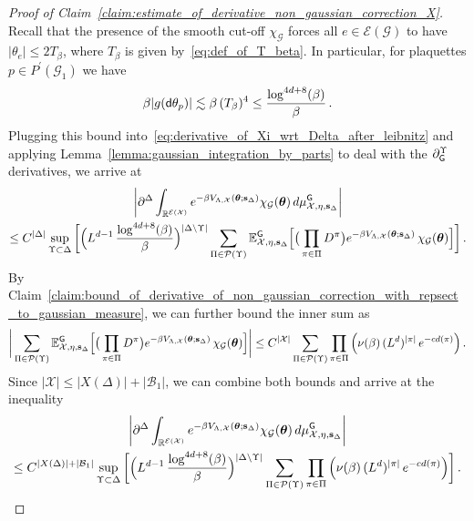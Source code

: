 \documentclass[10pt,a4paper]{amsart}
\def\La{{\Lambda}}
\newcommand{\bE}{\mathbb E}
\newcommand{\bR}{\mathbb R}
\newcommand{\cE}{\mathcal{E}}
\begin{document}
    \begin{proof}[Proof of Claim~\ref{claim:estimate_of_derivative_non_gaussian_correction_X}]
        Recall that the presence of the smooth cut-off $\chi_\mathcal{G}$ forces all $e\in \cE(\mathcal{G})$ to have $|\theta_e| \le 2 T_\beta$, where $T_\beta$ is given by~\eqref{eq:def_of_T_beta}. In particular, for plaquettes $p\in P^\prime(\mathcal{G}_1)$ we have 
        \[
        \beta |g({\sf d}\theta_p)| \lesssim \beta \,  (T_\beta)^4 \le \frac{\log^{4d+8}(\beta)}{\beta} \, .
        \]
        Plugging this bound into~\eqref{eq:derivative_of_Xi_wrt_Delta_after_leibnitz} and applying Lemma~\ref{lemma:gaussian_integration_by_parts} to deal with the $\partial_{\sf G}^{\Upsilon}$ derivatives, we arrive at 
        \begin{multline*}
            \bigg|\partial^\Delta \int_{\bR^{\cE(\mathcal{X})}} e^{-\beta V_{\Lambda,\mathcal{X}}(\boldsymbol{\theta};\mathbf{s}_\Delta)} \chi_{\mathcal{G}}(\boldsymbol{\theta}) \, {\rm d}\mu_{\mathcal{X},\eta,\mathbf{s}_\Delta}^{\sf G} \bigg| \\ \le C^{|\Delta|} \sup_{\Upsilon\subset \Delta} \bigg[ \Big(L^{d-1} \, \frac{\log^{4d+8}(\beta)}{\beta}\Big)^{|\Delta \setminus \Upsilon|} \sum_{\Pi\in \mathcal{P}(\Upsilon)} \bE_{\mathcal{X},\eta,\mathbf{s}_{\Delta}}^{\sf G} \Big[ \big( \prod_{\pi\in \Pi} D^\pi\big) e^{-\beta V_{\La,\mathcal{X}} (\boldsymbol{\theta}; \mathbf{s}_{\Delta})} \, \chi_{\mathcal{G}} (\boldsymbol{\theta})  \Big] \bigg] \, .
        \end{multline*}
        By Claim~\ref{claim:bound_of_derivative_of_non_gaussian_correction_with_repsect_to_gaussian_measure}, we can further bound the inner sum as
        \[
        \bigg|\sum_{\Pi\in \mathcal{P}(\Upsilon)} \bE_{\mathcal{X},\eta,\mathbf{s}_{\Delta}}^{\sf G} \Big[ \big( \prod_{\pi\in \Pi} D^\pi\big) e^{-\beta V_{\La,\mathcal{X}} (\boldsymbol{\theta}; \mathbf{s}_{\Delta})} \, \chi_{\mathcal{G}} (\boldsymbol{\theta})  \Big] \bigg| \le  C^{|\mathcal{X}|} \sum_{\Pi\in \mathcal{P}(\Upsilon)} \prod_{\pi\in \Pi} \Big(\nu(\beta) \, (L^d)^{|\pi|} \, e^{-c d(\pi)}\Big) \, .
        \]
        Since $|\mathcal{X}| \le |X(\Delta)| + |\mathcal{B}_1|$, we can combine both bounds and arrive at the inequality 
        \begin{multline} \label{eq:proof_of_claim:estimate_of_derivative_non_gaussian_correction_X_after_taking_derivatives}
             \bigg|\partial^\Delta \int_{\bR^{\cE(\mathcal{X})}} e^{-\beta V_{\Lambda,\mathcal{X}}(\boldsymbol{\theta};\mathbf{s}_\Delta)} \chi_{\mathcal{G}}(\boldsymbol{\theta}) \, {\rm d}\mu_{\mathcal{X},\eta,\mathbf{s}_\Delta}^{\sf G} \bigg| \\ \le C^{|X(\Delta)| + |\mathcal{B}_1|}  \sup_{\Upsilon\subset \Delta} \bigg[ \Big(L^{d-1} \, \frac{\log^{4d+8}(\beta)}{\beta}\Big)^{|\Delta \setminus \Upsilon|} \sum_{\Pi\in \mathcal{P}(\Upsilon)} \prod_{\pi\in \Pi} \Big(\nu(\beta) \, (L^d)^{|\pi|} \,  e^{-c d(\pi)}\Big) \bigg] \, .

\end{multline}
\end{proof}
\end{document}
